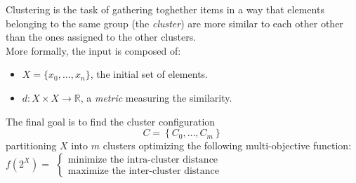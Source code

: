 Clustering is the task of gathering toghether items in a way that elements belonging
to the same group (the \emph{cluster}) are more similar to each other other than the ones
assigned to the other clusters.\\
More formally, the input is composed of:
\begin{itemize}
    \item $X = \{x_0, \dots ,x_n\}$, the initial set of elements.
    \item $d: X \times X \to \mathbb{R}$, a \emph{metric} measuring the similarity.
\end{itemize}
The final goal is to find the cluster configuration
\begin{equation*}
    C = \left\{ C_0, \dots , C_m \right\}
\end{equation*}
partitioning $X$
into $m$ clusters optimizing the following multi-objective function:\\

$f\left(2^X\right) =$
\begin{math}
    \left\{
        \begin{array}{l}
            \text{minimize the intra-cluster distance}
            \\
            \text{maximize the inter-cluster distance}
        \end{array}
    \right.
\end{math}
